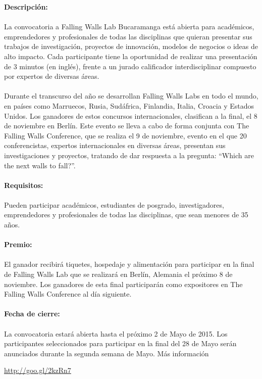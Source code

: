 \documentclass{book}
\begin{document}
\textbf{Descripción:}\\
\\
La convocatoria a Falling Walls Lab Bucaramanga está abierta para académicos, emprendedores y profesionales de todas las disciplinas que quieran presentar sus trabajos de investigación, proyectos de innovación, modelos de negocios o ideas de alto impacto. Cada participante tiene la oportunidad de realizar una presentación de 3 minutos (en inglés), frente a un jurado calificador interdisciplinar compuesto por expertos de diversas áreas.\\
\\
Durante el transcurso del año se desarrollan Falling Walls Labs en todo el mundo, en países como Marruecos, Rusia, Sudáfrica, Finlandia, Italia, Croacia y Estados Unidos. Los ganadores de estos concursos internacionales, clasifican a la final, el 8 de noviembre en Berlín. Este evento se lleva a cabo de forma conjunta con The Falling Walls Conference, que se realiza el 9 de noviembre, evento en el que 20 conferencistas, expertos internacionales en diversas áreas, presentan sus investigaciones y proyectos, tratando de dar respuesta a la pregunta: ``Which are the next walls to fall?''.\\
\\
\textbf{Requisitos:}\\
\\
Pueden participar académicos, estudiantes de posgrado, investigadores, emprendedores y profesionales de todas las disciplinas, que sean menores de 35 años.\\
\\
\textbf{Premio:}\\
\\
El ganador recibirá tiquetes, hospedaje y alimentación para participar en la final de Falling Walls Lab que se realizará en Berlín, Alemania el próximo 8 de noviembre. Los ganadores de esta final participarán como expositores en The Falling Walls Conference al día siguiente.\\
\\
\textbf{Fecha de cierre:}\\
\\
La convocatoria estará abierta hasta el próximo 2 de Mayo de 2015. Los participantes seleccionados para participar en la final del 28 de Mayo serán anunciados durante la segunda semana de Mayo. Más información\\
\begin{center}
\url{http://goo.gl/2kzRn7}
\end{center}
\end{document}
